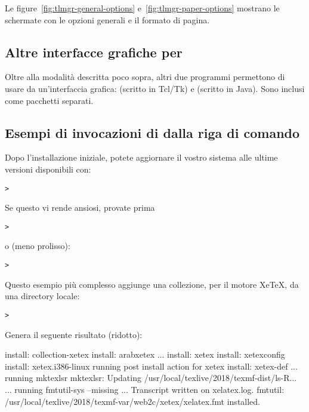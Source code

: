 \documentclass{article}
\begin{document}
Le figure~\ref{fig:tlmgr-general-options} e~\ref{fig:tlmgr-paper-options}
mostrano le schermate con le opzioni generali e il formato di pagina.

\subsection{Altre interfacce grafiche per }

Oltre alla modalità  descritta poco sopra, altri due programmi
permettono di usare  da un'interfaccia grafica:
 (scritto in Tcl/Tk) e  (scritto in Java).
Sono inclusi come pacchetti separati.

\subsection{Esempi di invocazioni di  dalla riga di comando}

Dopo l'installazione iniziale, potete aggiornare il vostro sistema alle
ultime versioni disponibili con:
\begin{alltt}
> 
\end{alltt}
Se questo vi rende ansiosi, provate prima
\begin{alltt}
> 
\end{alltt}
o (meno prolisso):
\begin{alltt}
> 
\end{alltt}

Questo esempio più complesso aggiunge una collezione, per il motore
Xe\TeX, da una directory locale:

\begin{alltt}
> 
\end{alltt}
Genera il seguente risultato (ridotto):
\begin{fverbatim}
install: collection-xetex
install: arabxetex
...
install: xetex
install: xetexconfig
install: xetex.i386-linux
running post install action for xetex
install: xetex-def
...
running mktexlsr
mktexlsr: Updating /usr/local/texlive/2018/texmf-dist/ls-R...
...
running fmtutil-sys --missing
...
Transcript written on xelatex.log.
fmtutil: /usr/local/texlive/2018/texmf-var/web2c/xetex/xelatex.fmt installed.
\end{fverbatim}
\end{document}
